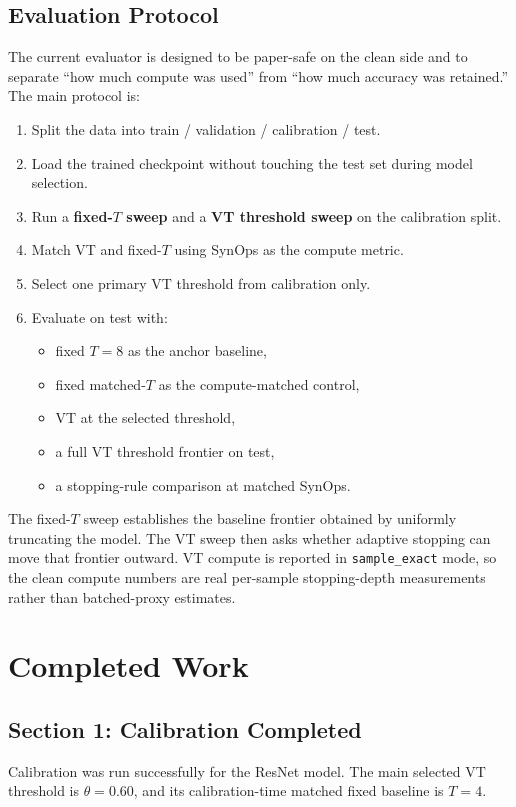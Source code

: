 \documentclass[11pt]{article}
\begin{document}
\subsection{Evaluation Protocol}
The current evaluator is designed to be paper-safe on the clean side and to separate ``how much compute was used'' from ``how much accuracy was retained.'' The main protocol is:
\begin{enumerate}[leftmargin=1.5em]
    \item Split the data into train / validation / calibration / test.
    \item Load the trained checkpoint without touching the test set during model selection.
    \item Run a \textbf{fixed-$T$ sweep} and a \textbf{VT threshold sweep} on the calibration split.
    \item Match VT and fixed-$T$ using SynOps as the compute metric.
    \item Select one primary VT threshold from calibration only.
    \item Evaluate on test with:
    \begin{itemize}[leftmargin=1.5em]
        \item fixed $T=8$ as the anchor baseline,
        \item fixed matched-$T$ as the compute-matched control,
        \item VT at the selected threshold,
        \item a full VT threshold frontier on test,
        \item a stopping-rule comparison at matched SynOps.
    \end{itemize}
\end{enumerate}

The fixed-$T$ sweep establishes the baseline frontier obtained by uniformly truncating the model. The VT sweep then asks whether adaptive stopping can move that frontier outward. VT compute is reported in \texttt{sample\_exact} mode, so the clean compute numbers are real per-sample stopping-depth measurements rather than batched-proxy estimates.

\section{Completed Work}
\subsection{Section 1: Calibration Completed}
Calibration was run successfully for the ResNet model. The main selected VT threshold is $\theta = 0.60$, and its calibration-time matched fixed baseline is $T=4$.
\end{document}
